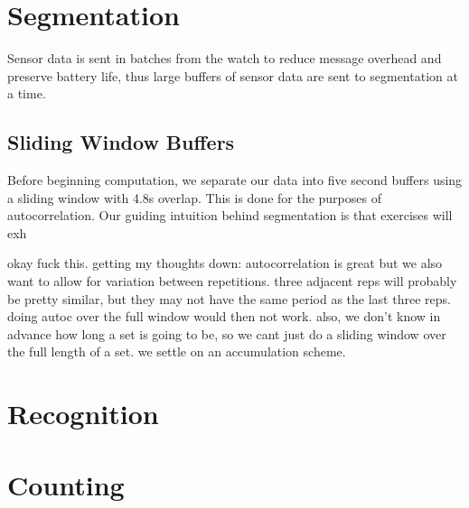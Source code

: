 \section{Segmentation}

Sensor data is sent in batches from the watch to reduce message overhead and preserve battery life, thus large buffers of sensor data are sent to segmentation at a time.

\subsection{Sliding Window Buffers}
Before beginning computation, we separate our data into five second buffers using a sliding window with 4.8s overlap. This is done for the purposes of autocorrelation. Our guiding intuition behind segmentation is that exercises will exh

okay fuck this. getting my thoughts down: 
autocorrelation is great but we also want to allow for variation between repetitions. three adjacent reps will probably be pretty similar, but they may not have the same period as the last three reps. doing autoc over the full window would then not work. also, we don't know in advance how long a set is going to be, so we cant just do a sliding window over the full length of a set. we settle on an accumulation scheme. 



























































\section{Recognition}







\section{Counting}